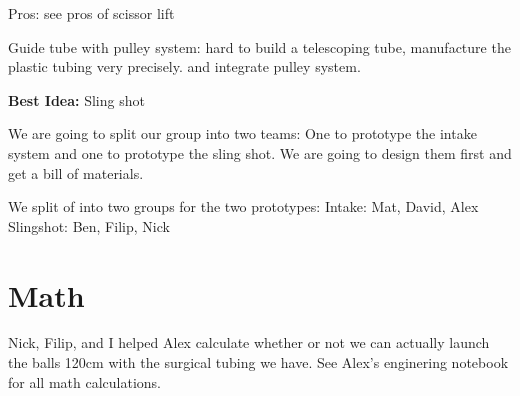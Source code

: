 Pros: see pros of scissor lift

\textbf{}{Guide tube with pulley system:}
hard to build a telescoping tube, manufacture the plastic tubing very precisely. and integrate pulley system.

\textbf{Best Idea:}
 Sling shot

We are going to split our group into two teams: One to prototype the intake system and one to prototype the sling shot. We are going to design them first and get a bill of materials. 

We split of into two groups for the two prototypes: 
Intake: Mat, David, Alex
Slingshot: Ben, Filip, Nick 

\section*{Math}
Nick, Filip, and I helped Alex calculate whether or not we can actually launch the balls 120cm with the surgical tubing we have. See Alex's enginering notebook for all math calculations. 
